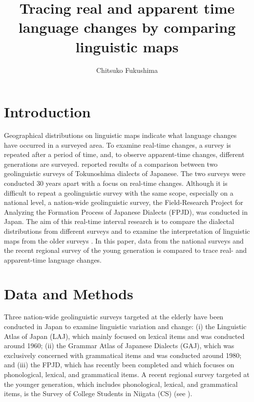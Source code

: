 \documentclass[output=paper]{LSP/langsci}
\author{Chitsuko Fukushima\affiliation{University of Niigata Prefecture, Faculty of International Studies and Regional Development}}
\title{Tracing real and apparent time language changes by comparing linguistic maps}
\begin{document}
\section{Introduction}
Geographical distributions on linguistic maps indicate what language changes have occurred in a surveyed area. To examine real-time changes, a survey is repeated after a period of time, and, to observe apparent-time changes, different generations are surveyed. \citet{fukushima_revisiting_2013} reported results of a comparison between two geolinguistic surveys of Tokunoshima dialects of Japanese. The two surveys were conducted 30 years apart with a focus on real-time changes. Although it is difficult to repeat a geolinguistic survey with the same scope, especially on a national level, a nation-wide geolinguistic survey, the Field-Research Project for Analyzing the Formation Process of Japanese Dialects (\textsc{FPJD}), was conducted in Japan. The aim of this real-time interval research is to compare the dialectal distributions from different surveys and to examine the interpretation of linguistic maps from the older surveys \citep{onishi_timespan_2014}. In this paper, data from the national surveys and the recent regional survey of the young generation is compared to trace real- and apparent-time language changes.

\section{Data and Methods}

Three nation-wide geolinguistic surveys targeted at the elderly have been conducted in Japan to examine linguistic variation and change: (i) the Linguistic Atlas of Japan (\textsc{LAJ}), which mainly focused on lexical items and was conducted around 1960; (ii) the Grammar Atlas of Japanese Dialects (\textsc{GAJ}), which was exclusively concerned with grammatical items and was conducted around 1980; and (iii) the \textsc{FPJD}, which has recently been completed and which focuses on phonological, lexical, and grammatical items. A recent regional survey targeted at the younger generation, which includes phonological, lexical, and grammatical items, is the Survey of College Students in Niigata (\textsc{CS}) (see ).
\end{document}
